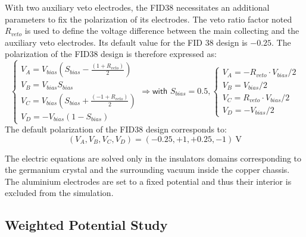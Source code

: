 
With two auxiliary veto electrodes, the FID38 necessitates an additional parameters to fix the polarization of its electrodes. The veto ratio factor noted $R_{veto}$ is used to define the voltage difference between the main collecting and the auxiliary veto electrodes. Its default value for the FID 38 design is $-0.25$. The polarization of the FID38 design is therefore expressed as:
\begin{equation}
\label{eq:fid38-polarization}
\begin{cases}
\displaystyle 
V_A = V_{bias} \left( S_{bias} - \frac{\left( 1 + R_{veto}\right)}{2}\right)
\\
\displaystyle
V_B = V_{bias} S_{bias}
\\
\displaystyle
V_C = V_{bias} \left( S_{bias} + \frac{\left( -1 + R_{veto}\right)}{2}\right)
\\
\displaystyle
V_D = - V_{bias} (1 - S_{bias})
\end{cases}
\Rightarrow
\textsf{with } S_{bias} = 0.5,
\begin{cases}
\displaystyle 
V_A = - R_{veto} \cdot V_{bias} /2
\\
\displaystyle
V_B = V_{bias} /2 
\\
\displaystyle
V_C = R_{veto} \cdot V_{bias} /2
\\
\displaystyle
V_D = -  V_{bias}/2
\end{cases}
\end{equation}
The default polarization of the FID38 design corresponds to:
\begin{equation}
\label{eq:fid38-polarization-default}
\left( V_A, V_B, V_C, V_D \right) = (-0.25, +1, +0.25, -1) \ \si{\volt}
\end{equation}


The electric equations are solved only in the insulators domains corresponding to the germanium crystal and the surrounding vacuum inside the copper chassis. The aluminium electrodes are set to a fixed potential and thus their interior is excluded from the simulation. 


\subsection{Weighted Potential Study}
\label{par:weighting-potential}

